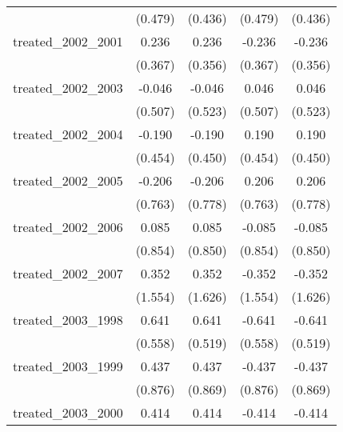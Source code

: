 {\begin{tabular}{l*{4}{c}}
            &     (0.479)         &     (0.436)         &     (0.479)         &     (0.436)         \\
[1em]
treated\_2002\_2001&       0.236         &       0.236         &      -0.236         &      -0.236         \\
            &     (0.367)         &     (0.356)         &     (0.367)         &     (0.356)         \\
[1em]
treated\_2002\_2003&      -0.046         &      -0.046         &       0.046         &       0.046         \\
            &     (0.507)         &     (0.523)         &     (0.507)         &     (0.523)         \\
[1em]
treated\_2002\_2004&      -0.190         &      -0.190         &       0.190         &       0.190         \\
            &     (0.454)         &     (0.450)         &     (0.454)         &     (0.450)         \\
[1em]
treated\_2002\_2005&      -0.206         &      -0.206         &       0.206         &       0.206         \\
            &     (0.763)         &     (0.778)         &     (0.763)         &     (0.778)         \\
[1em]
treated\_2002\_2006&       0.085         &       0.085         &      -0.085         &      -0.085         \\
            &     (0.854)         &     (0.850)         &     (0.854)         &     (0.850)         \\
[1em]
treated\_2002\_2007&       0.352         &       0.352         &      -0.352         &      -0.352         \\
            &     (1.554)         &     (1.626)         &     (1.554)         &     (1.626)         \\
[1em]
treated\_2003\_1998&       0.641         &       0.641         &      -0.641         &      -0.641         \\
            &     (0.558)         &     (0.519)         &     (0.558)         &     (0.519)         \\
[1em]
treated\_2003\_1999&       0.437         &       0.437         &      -0.437         &      -0.437         \\
            &     (0.876)         &     (0.869)         &     (0.876)         &     (0.869)         \\
[1em]
treated\_2003\_2000&       0.414         &       0.414         &      -0.414         &      -0.414         \\

\end{tabular}}
